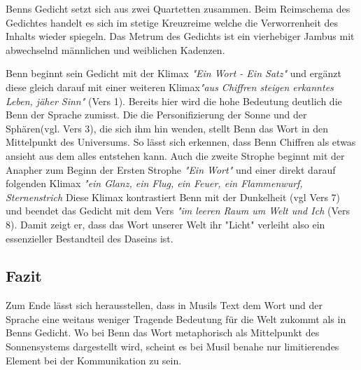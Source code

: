 \documentclass{article}
\begin{document}
    Benns Gedicht setzt sich aus zwei Quartetten zusammen. Beim Reimschema des Gedichtes handelt es sich im
    stetige Kreuzreime welche die Verworrenheit des Inhalts wieder spiegeln. Das Metrum des Gedichts ist ein
    vierhebiger Jambus mit abwechselnd männlichen und weiblichen Kadenzen.

    Benn beginnt sein Gedicht mit der Klimax \textit{"Ein Wort - Ein Satz"} und ergänzt diese gleich darauf mit einer weiteren Klimax\textit{"aus Chiffren steigen erkanntes Leben, jäher Sinn"} (Vers 1).
    Bereits hier wird die hohe Bedeutung deutlich die Benn der Sprache zumisst.
    Die die Personifizierung der Sonne und der Sphären(vgl. Vers 3), die sich ihm hin wenden, stellt Benn das Wort in den Mittelpunkt des Universums.
    So lässt sich erkennen, dass Benn Chiffren als etwas ansieht aus dem alles entstehen kann.
    Auch die zweite Strophe beginnt mit der Anapher zum Beginn der Ersten Strophe \textit{"Ein Wort"} und einer direkt darauf folgenden Klimax \textit{"ein Glanz, ein Flug, ein Feuer, ein Flammenwurf, Sternenstrich}
    Diese Klimax kontrastiert Benn mit der Dunkelheit (vgl Vers 7) und beendet das Gedicht mit dem Vers \textit{"im leeren Raum um Welt und Ich} (Vers 8). Damit zeigt er, dass das Wort unserer Welt
    ihr "Licht" verleiht also ein essenzieller Bestandteil des Daseins ist. 

\subsection*{Fazit}
    Zum Ende lässt sich herausstellen, dass in Musils Text dem Wort und der Sprache eine weitaus weniger Tragende Bedeutung für die Welt zukommt als in Benns Gedicht.
    Wo bei Benn das Wort metaphorisch als Mittelpunkt des Sonnensystems dargestellt wird, scheint es bei Musil benahe nur limitierendes Element bei der Kommunikation zu sein.
\end{document}

